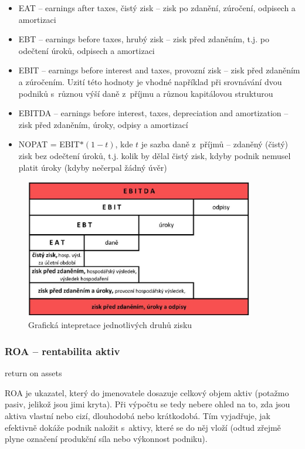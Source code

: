 \begin{itemize}
\item EAT -- earnings after taxes, čistý zisk -- zisk po zdanění, zúročení, odpisech a amortizaci

\item EBT -- earnings before taxes, hrubý zisk -- zisk před zdaněním, t.j. po odečtení úroků, odpisech a amortizaci

\item EBIT -- earnings before interest and taxes, provozní zisk -- zisk před zdaněním a zúročením. Uzití této hodnoty je vhodné například při srovnávání dvou podniků s~různou výší daně z~příjmu a různou kapitálovou strukturou

\item EBITDA -- earnings before interest, taxes, depreciation and amortization -- zisk před zdaněním, úroky, odpisy a amortizací

\item NOPAT = EBIT$*(1-t)$, kde $t$ je sazba daně z~příjmů  -- zdaněný (čistý) zisk bez odečtení úroků, t.j. kolik by dělal čistý zisk, kdyby podnik nemusel platit úroky (kdyby nečerpal žádný úvěr)
\end{itemize}


\begin{figure}
  \centering
  \includegraphics[width=10cm]{img/zisk.eps}
  \caption{Grafická intepretace jednotlivých druhů zisku}
\end{figure}

\subsubsection{ROA -- rentabilita aktiv}
return on assets

ROA je ukazatel, který do jmenovatele dosazuje celkový objem aktiv (potažmo pasiv, jelikož jsou jimi kryta). Při výpočtu se tedy nebere ohled na to, zda jsou aktiva vlastní nebo cizí, dlouhodobá nebo krátkodobá. Tím vyjadřuje, jak efektivně dokáže podnik naložit s~aktivy, které se do něj vloží (odtud zřejmě plyne označení produkční síla nebo výkonnost podniku).

